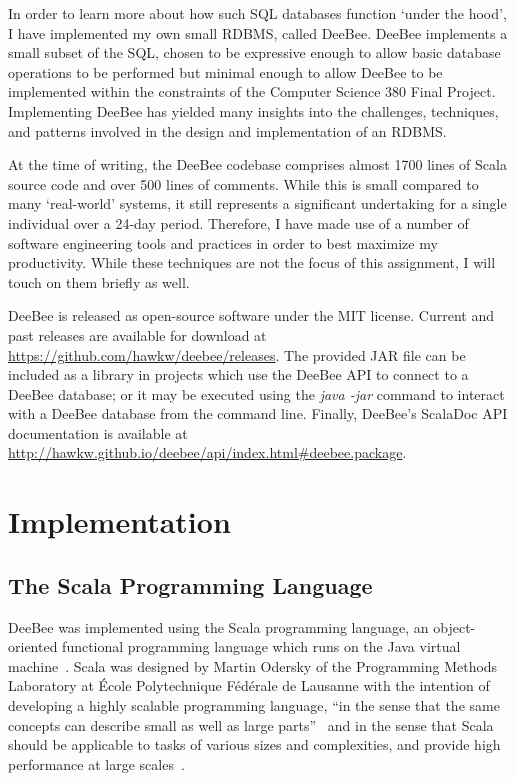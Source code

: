 In order to learn more about how such SQL databases function `under the hood', I have implemented my own small RDBMS, called DeeBee. DeeBee implements a small subset of the SQL, chosen to be expressive enough to allow basic database operations to be performed but minimal enough to allow DeeBee to be implemented within the constraints of the Computer Science 380 Final Project. Implementing DeeBee has yielded many insights into the challenges, techniques, and patterns involved in the design and implementation of an RDBMS.

At the time of writing, the DeeBee codebase comprises almost 1700 lines of Scala source code and over 500 lines of comments. While this is small compared to many `real-world' systems, it still represents a significant undertaking for a single individual over a 24-day period. Therefore, I have made use of a number of software engineering tools and practices in order to best maximize my productivity. While these techniques are not the focus of this assignment, I will touch on them briefly as well.

DeeBee is released as open-source software under the MIT license. Current and past releases are available for download at \url{https://github.com/hawkw/deebee/releases}. The provided JAR file can be included as a library in projects which use the DeeBee API to connect to a DeeBee database; or it may be executed using the \textit{java -jar} command to interact with a DeeBee database from the command line. Finally, DeeBee's ScalaDoc API documentation is available at \url{http://hawkw.github.io/deebee/api/index.html#deebee.package}.

\section{Implementation}

\subsection{The Scala Programming Language}

DeeBee was implemented using the Scala programming language, an object-oriented functional programming language which runs on the Java virtual machine~\cite{odersky2004scala,odersky2004overview,odersky2008programming}. Scala was designed by Martin Odersky of the Programming Methods Laboratory at \'Ecole Polytechnique F\'ed\'erale de Lausanne with the intention of developing a highly scalable programming language, ``in the sense that the same concepts can describe small as well as large parts''~\cite{odersky2004scala} and in the sense that Scala should be applicable to tasks of various sizes and complexities, and provide high performance at large scales~\cite{odersky2008programming}. 

